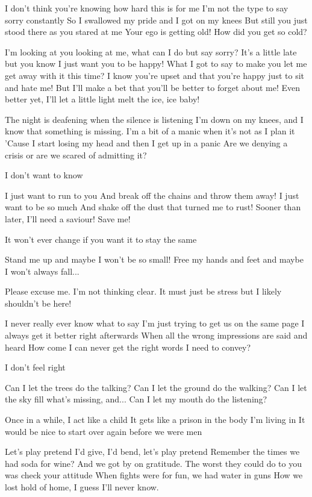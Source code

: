 I don't think you're knowing how hard this is for me
I'm not the type to say sorry constantly
So I swallowed my pride and I got on my knees
But still you just stood there as you stared at me
Your ego is getting old! How did you get so cold?

I'm looking at you looking at me, what can I do but say sorry?
It's a little late but you know I just want you to be happy!
What I got to say to make you let me get away with it this time?
I know you're upset and that you're happy just to sit and hate me!
But I'll make a bet that you'll be better to forget about me!
Even better yet, I'll let a little light melt the ice, ice baby!


The night is deafening when the silence is listening
I'm down on my knees, and I know that something is missing.
I'm a bit of a manic when it's not as I plan it
'Cause I start losing my head and then I get up in a panic
Are we denying a crisis or are we scared of admitting it?

I don't want to know

I just want to run to you
And break off the chains and throw them away!
I just want to be so much
And shake off the dust that turned me to rust!
Sooner than later, I'll need a saviour!
Save me!

It won't ever change if you want it to stay the same

Stand me up and maybe I won't be so small!
Free my hands and feet and maybe I won't always fall...


Please excuse me. I'm not thinking clear.
It must just be stress but I likely shouldn't be here!

I never really ever know what to say
I'm just trying to get us on the same page
I always get it better right afterwards
When all the wrong impressions are said and heard
How come I can never get the right words I need to convey?

I don't feel right

Can I let the trees do the talking?
Can I let the ground do the walking?
Can I let the sky fill what's missing, and...
Can I let my mouth do the listening?


Once in a while, I act like a child
It gets like a prison in the body I'm living in
It would be nice to start over again before we were men

Let's play pretend
I'd give, I'd bend, let's play pretend
Remember the times we had soda for wine?
And we got by on gratitude.
The worst they could do to you was check your attitude
When fights were for fun, we had water in guns
How we lost hold of home, I guess I'll never know.

